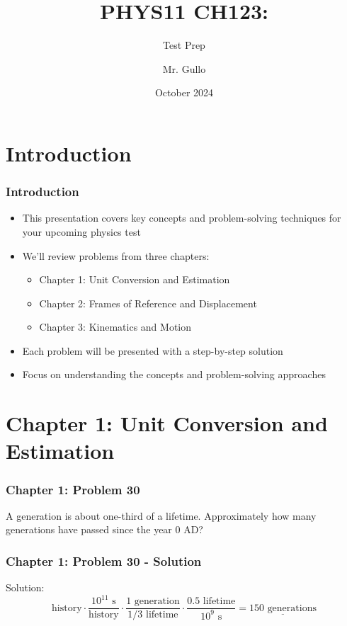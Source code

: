 \documentclass{beamer}
\title[Unit 1 Review]{PHYS11 CH123:}
\subtitle{Test Prep}
\author[Mr. Gullo]{Mr. Gullo}
\date[Oct 2024]{October 2024}
\begin{document}
\frame{\titlepage}

\section{Introduction}

\begin{frame}
\frametitle{Introduction}
\begin{itemize}
    \item This presentation covers key concepts and problem-solving techniques for your upcoming physics test
    \item We'll review problems from three chapters:
    \begin{itemize}
        \item Chapter 1: Unit Conversion and Estimation
        \item Chapter 2: Frames of Reference and Displacement
        \item Chapter 3: Kinematics and Motion
    \end{itemize}
    \item Each problem will be presented with a step-by-step solution
    \item Focus on understanding the concepts and problem-solving approaches
\end{itemize}
\end{frame}

\section{Chapter 1: Unit Conversion and Estimation}

\begin{frame}
\frametitle{Chapter 1: Problem 30}
A generation is about one-third of a lifetime. Approximately how many generations have passed since the year 0 AD?
\end{frame}

\begin{frame}
\frametitle{Chapter 1: Problem 30 - Solution}
Solution:
\begin{equation*}
\text{history} \cdot \frac{10^{11} \text{ s}}{\text{history}} \cdot \frac{1 \text{ generation}}{1/3 \text{ lifetime}} \cdot \frac{0.5 \text{ lifetime}}{10^{9} \text{ s}} = \underline{150 \text{ generations}}
\end{equation*}
\end{frame}
\end{document}

